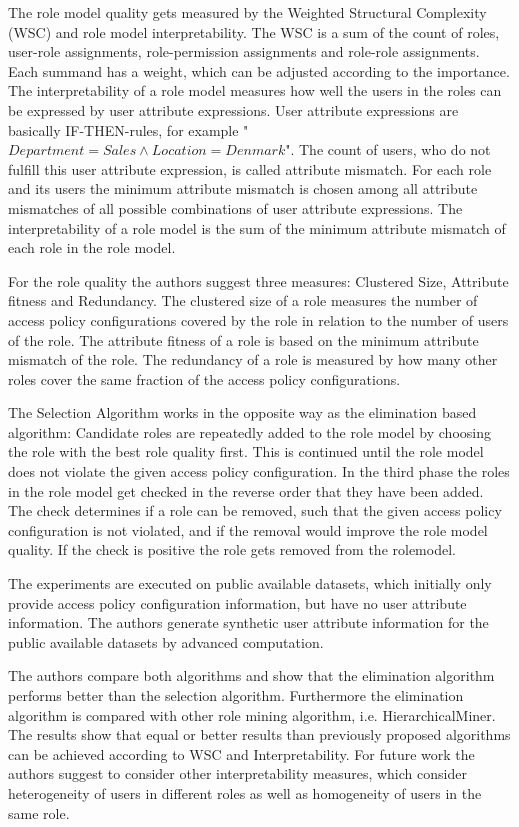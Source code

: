 The role model quality gets measured by the Weighted Structural Complexity (WSC) and role model interpretability. The WSC is a sum of the count of roles, user-role assignments, role-permission assignments and role-role assignments. Each summand has a weight, which can be adjusted according to the importance. The interpretability of a role model measures how well the users in the roles can be expressed by user attribute expressions. User attribute expressions are basically IF-THEN-rules, for example "$Department=Sales \wedge Location=Denmark$". The count of users, who do not fulfill this user attribute expression, is called attribute mismatch. For each role and its users the minimum attribute mismatch is chosen among all attribute mismatches of all possible combinations of user attribute expressions. The interpretability of a role model is the sum of the minimum attribute mismatch of each role in the role model.

For the role quality the authors suggest three measures: Clustered Size, Attribute fitness and Redundancy. The clustered size of a role measures the number of access policy configurations covered by the role in relation to the number of users of the role. The attribute fitness of a role is based on the minimum attribute mismatch of the role. The redundancy of a role is measured by how many other roles cover the same fraction of the access policy configurations.

The Selection Algorithm works in the opposite way as the elimination based algorithm: Candidate roles are repeatedly added to the role model by choosing the role with the best role quality first. This is continued until the role model does not violate the given access policy configuration. In the third phase the roles in the role model get checked in the reverse order that they have been added. The check determines if a role can be removed, such that the given access policy configuration is not violated, and if the removal would improve the role model quality. If the check is positive the role gets removed from the rolemodel.

The experiments are executed on public available datasets, which initially only provide access policy configuration information, but have no user attribute information. The authors generate synthetic user attribute information for the public available datasets by advanced computation.

The authors compare both algorithms and show that the elimination algorithm performs better than the selection algorithm. Furthermore the elimination algorithm is compared with other role mining algorithm, i.e. HierarchicalMiner\cite{Molloy:2010}. The results show that equal or better results than previously proposed algorithms can be achieved according to WSC and Interpretability. For future work the authors suggest to consider other interpretability measures, which consider heterogeneity of users in different roles as well as homogeneity of users in the same role.

